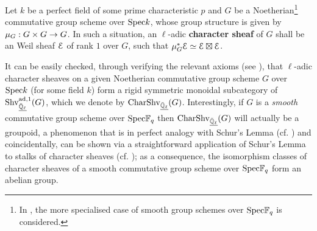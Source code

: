             \begin{definition} \label{def: character_sheaves}
                Let $k$ be a perfect field of some prime characteristic $p$ and $G$ be a Noetherian\footnote{In \cite{cunningham_roe_function_sheaf_dictionary_quasi_characters_p_adic_tori}, the more specialised case of smooth group schemes over $\mathrm{Spec} \mathbb{F}_q$ is considered.} commutative group scheme over $\mathrm{Spec} k$, whose group structure is given by $\mu_G: G \x G \to G$. In such a situation, an $\ell$-adic \textbf{character sheaf} of $G$ shall be an Weil sheaf $\mathcal{E}$ of rank $1$ over $G$, such that $\mu_G^*\mathcal{E} \simeq \mathcal{E} \boxtimes \mathcal{E}$.
            \end{definition}
            \begin{remark} \label{remark: rigid_monoidal_categories_of_character_sheaves}
                \cite[Subsection 1.2]{cunningham_roe_function_sheaf_dictionary_quasi_characters_p_adic_tori} It can be easily checked, through verifying the relevant axioms (see \cite[Definition 2.10.11]{EGNO}), that $\ell$-adic character sheaves on a given Noetherian commutative group scheme $G$ over $\mathrm{Spec} k$ (for some field $k$) form a rigid symmetric monoidal subcategory of $\mathrm{Shv}_{\underline{\bar{\mathbb{Q}}_{\ell}}}^{\mathrm{ad}, 1}(G)$, which we denote by $\mathrm{Char}\mathrm{Shv}_{\underline{\bar{\mathbb{Q}}_{\ell}}}(G)$. Interestingly, if $G$ is a \textit{smooth} commutative group scheme over $\mathrm{Spec} \mathbb{F}_q$ then $\mathrm{Char}\mathrm{Shv}_{\underline{\bar{\mathbb{Q}}_{\ell}}}(G)$ will actually be a groupoid, a phenomenon that is in perfect analogy with Schur's Lemma (cf. \cite[Lemma 3.6]{lam_first_course_in_noncommutative_rings}) and coincidentally, can be shown via a straightforward application of Schur's Lemma to stalks of character sheaves (cf. \cite[Lemma 1.3]{cunningham_roe_function_sheaf_dictionary_quasi_characters_p_adic_tori}); as a consequence, the isomorphism classes of character sheaves of a smooth commutative group scheme over $\mathrm{Spec} \mathbb{F}_q$ form an abelian group. 
            \end{remark}
